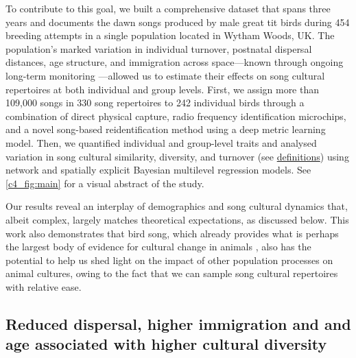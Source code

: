 To contribute to this goal, we built a comprehensive dataset that spans three years and documents the dawn songs produced by male great tit birds during 454 breeding attempts in a single population located in Wytham Woods, UK. The population's marked variation in individual turnover, postnatal dispersal distances, age structure, and immigration across space---known through ongoing long-term monitoring \parencite{lack1964}---allowed us to estimate their effects on song cultural repertoires at both individual and group levels. First, we assign more than 109,000 songs in 330 song repertoires to 242 individual birds through a combination of direct physical capture, radio frequency identification microchips, and a novel song-based reidentification method using a deep metric learning model. Then, we quantified individual and group-level traits and analysed variation in song cultural similarity, diversity, and turnover (see \hyperref[sc:group-properties]{definitions}) using network and spatially explicit Bayesian multilevel regression models. See \autoref{c4_fig:main} for a visual abstract of the study.

Our results reveal an interplay of demographics and song cultural dynamics that, albeit complex, largely matches theoretical expectations, as discussed below. This work also demonstrates that bird song, which already provides what is perhaps the largest body of evidence for cultural change in animals \parencite{laland2006}, also has the potential to help us shed light on the impact of other population processes on animal cultures, owing to the fact that we can sample song cultural repertoires with relative ease.


\subsection{Reduced dispersal, higher immigration and and age associated with higher cultural diversity}

